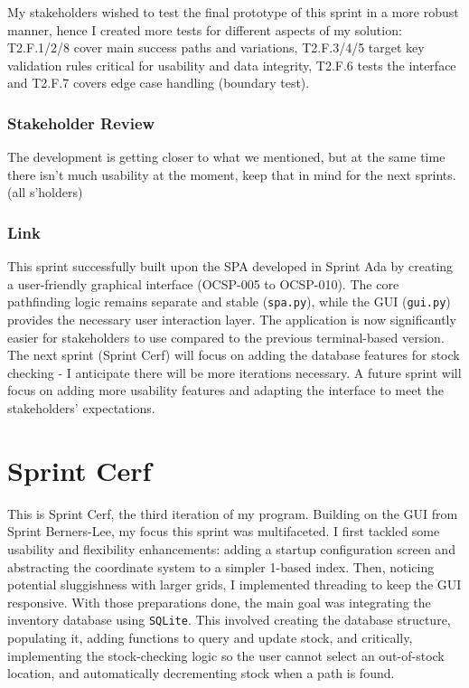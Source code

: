 My stakeholders wished to test the final prototype of this sprint in a more robust manner, hence I created more tests for different aspects of my solution: T2.F.1/2/8 cover main success paths and variations, T2.F.3/4/5 target key validation rules critical for usability and data integrity, T2.F.6 tests the interface and T2.F.7 covers edge case handling (boundary test).

\subsubsection{Stakeholder Review}

The development is getting closer to what we mentioned, but at the same time there isn't much usability at the moment, keep that in mind for the next sprints. (all s'holders)

\subsubsection{Link}
This sprint successfully built upon the SPA developed in Sprint Ada by creating a user-friendly graphical interface (OCSP-005 to OCSP-010). The core pathfinding logic remains separate and stable (\verb|spa.py|), while the GUI (\verb|gui.py|) provides the necessary user interaction layer. The application is now significantly easier for stakeholders to use compared to the previous terminal-based version. The next sprint (Sprint Cerf) will focus on adding the database features for stock checking - I anticipate there will be more iterations necessary. A future sprint will focus on adding more usability features and adapting the interface to meet the stakeholders' expectations.

\newpage

\section{Sprint Cerf}

This is Sprint Cerf, the third iteration of my program. Building on the GUI from Sprint Berners-Lee, my focus this sprint was multifaceted. I first tackled some usability and flexibility enhancements: adding a startup configuration screen and abstracting the coordinate system to a simpler 1-based index. Then, noticing potential sluggishness with larger grids, I implemented threading to keep the GUI responsive. With those preparations done, the main goal was integrating the inventory database using \verb|SQLite|. This involved creating the database structure, populating it, adding functions to query and update stock, and critically, implementing the stock-checking logic so the user cannot select an out-of-stock location, and automatically decrementing stock when a path is found.

